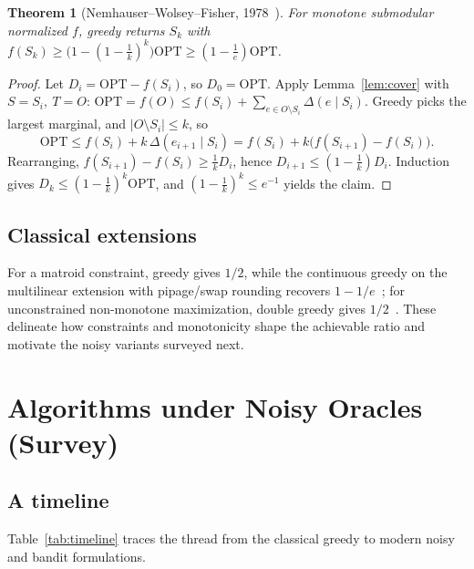 \documentclass[11pt]{article}
\theoremstyle{plain}
\newtheorem{theorem}{Theorem}
\theoremstyle{definition}
\newcommand{\OPT}{\mathrm{OPT}}
\newcommand{\marg}[2]{\Delta(#1\mid #2)}
\begin{document}
\begin{theorem}[Nemhauser--Wolsey--Fisher, 1978~\cite{NWF1978}]\label{thm:greedy}
For monotone submodular normalized $f$, greedy returns $S_k$ with
$f(S_k)\ge\big(1-(1-\tfrac1k)^k\big)\OPT\ge(1-\tfrac1e)\OPT$.
\end{theorem}
\begin{proof}
Let $D_i=\OPT-f(S_i)$, so $D_0=\OPT$. Apply Lemma~\ref{lem:cover} with
$S=S_i,\ T=O$:
$\OPT=f(O)\le f(S_i)+\sum_{e\in O\setminus S_i}\marg{e}{S_i}$.
Greedy picks the largest marginal, and $|O\setminus S_i|\le k$, so
\[
\OPT\le f(S_i)+k\,\marg{e_{i+1}}{S_i}=f(S_i)+k\big(f(S_{i+1})-f(S_i)\big).
\]
Rearranging, $f(S_{i+1})-f(S_i)\ge\tfrac1k D_i$, hence
$D_{i+1}\le(1-\tfrac1k)D_i$. Induction gives
$D_k\le(1-\tfrac1k)^k\OPT$, and $(1-\tfrac1k)^k\le e^{-1}$ yields the claim.
\end{proof}

\subsection{Classical extensions}
For a matroid constraint, greedy gives $1/2$, while the continuous greedy on
the multilinear extension with pipage/swap rounding recovers
$1-1/e$~\cite{CCPV2011}; for unconstrained non-monotone maximization,
double greedy gives $1/2$~\cite{BuchbinderFNS2015}. These delineate how
constraints and monotonicity shape the achievable ratio and motivate the
noisy variants surveyed next.

\section{Algorithms under Noisy Oracles (Survey)}\label{sec:noisy}

\subsection{A timeline}
Table~\ref{tab:timeline} traces the thread from the classical greedy to
modern noisy and bandit formulations.
\end{document}
